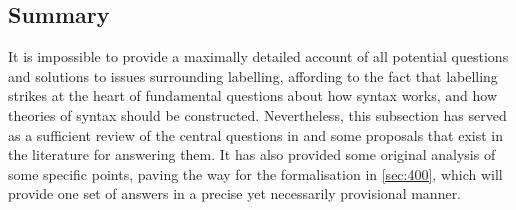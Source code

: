 \subsection{Summary}\label{sec:360}

It is impossible to provide a maximally detailed account of all potential questions and solutions to issues surrounding labelling, affording to the fact that labelling strikes at the heart of fundamental questions about how syntax works, and how theories of syntax should be constructed. Nevertheless, this subsection has served as a sufficient review of the central questions in  and some proposals that exist in the literature for answering them. It has also provided some original analysis of some specific points, paving the way for the formalisation in \autoref{sec:400}, which will provide one set of answers in a precise yet necessarily provisional manner.
